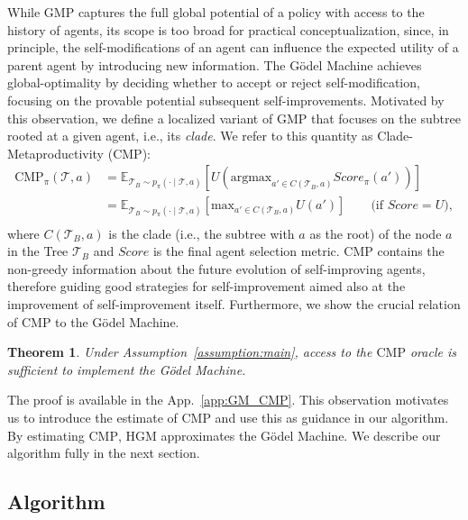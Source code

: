 \documentclass{article} %
\newtheorem{theorem}{Theorem}
\begin{document}
While $\mathrm{GMP}$ captures the full global potential of a policy with access to the history of agents, its scope is too broad for practical conceptualization, since, in principle, the self-modifications of an agent can influence the expected utility of a parent agent by introducing new information.
The G\"odel Machine achieves global-optimality by deciding whether to accept or reject self-modification, focusing on the provable potential subsequent self-improvements.
Motivated by this observation, we define a localized variant of $\mathrm{GMP}$ that focuses on the subtree rooted at a given agent, i.e., its \emph{clade}. 
We refer to this quantity as Clade-Metaproductivity ($\mathrm{CMP}$):
\begin{align*}
\mathrm{CMP}_\pi(\mathcal{T},a) &= \mathbb{E}_{\mathcal{T}_B \sim p_\pi(\cdot \mid \mathcal{T},a)}
\left[  U(\text{argmax}_{a' \in C(\mathcal{T}_B, a)}Score_\pi(a')) \right]\\
&=\mathbb{E}_{\mathcal{T}_B \sim p_\pi(\cdot \mid \mathcal{T},a)}
\left[  \text{max}_{a' \in C(\mathcal{T}_B, a)}U(a') \right] \qquad \text{(if $Score = U$)},\\
\end{align*}    
 where $C(\mathcal{T}_B, a)$ is the clade (i.e., the subtree with $a$ as the root) of the node $a$ in the Tree $\mathcal{T}_B$ and $Score$ is the final agent selection metric.
 $\mathrm{CMP}$ contains the non-greedy information about the future evolution of self-improving agents, therefore guiding good strategies for self-improvement aimed also at the improvement of self-improvement itself. Furthermore, we show the crucial relation of $\mathrm{CMP}$ to the G\"odel Machine.



\begin{theorem}\label{thm:main}
Under Assumption~\ref{assumption:main}, access to the $\mathrm{CMP}$ oracle is sufficient to implement the G\"odel Machine.
\end{theorem}

The proof is available in the App.~\ref{app:GM_CMP}. This observation motivates us to introduce the estimate of $\mathrm{CMP}$ and use this as guidance in our algorithm. 
By estimating $\mathrm{CMP}$, HGM approximates the G\"odel Machine. We describe our algorithm fully in the next section.





\subsection{Algorithm}\label{sec:main_alg}
\end{document}
